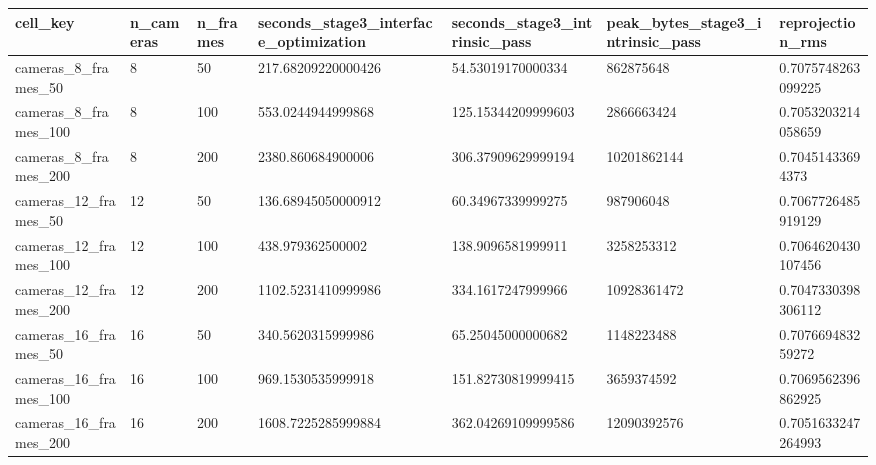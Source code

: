 \begin{tabular}{|l|l|l|l|l|l|l|}
\hline
cell\_key & n\_cameras & n\_frames & seconds\_stage3\_interface\_optimization & seconds\_stage3\_intrinsic\_pass & peak\_bytes\_stage3\_intrinsic\_pass & reprojection\_rms \\
\hline
cameras\_8\_frames\_50 & 8 & 50 & 217.68209220000426 & 54.53019170000334 & 862875648 & 0.7075748263099225 \\
cameras\_8\_frames\_100 & 8 & 100 & 553.0244944999868 & 125.15344209999603 & 2866663424 & 0.7053203214058659 \\
cameras\_8\_frames\_200 & 8 & 200 & 2380.860684900006 & 306.37909629999194 & 10201862144 & 0.70451433694373 \\
cameras\_12\_frames\_50 & 12 & 50 & 136.68945050000912 & 60.34967339999275 & 987906048 & 0.7067726485919129 \\
cameras\_12\_frames\_100 & 12 & 100 & 438.979362500002 & 138.9096581999911 & 3258253312 & 0.7064620430107456 \\
cameras\_12\_frames\_200 & 12 & 200 & 1102.5231410999986 & 334.1617247999966 & 10928361472 & 0.7047330398306112 \\
cameras\_16\_frames\_50 & 16 & 50 & 340.5620315999986 & 65.25045000000682 & 1148223488 & 0.707669483259272 \\
cameras\_16\_frames\_100 & 16 & 100 & 969.1530535999918 & 151.82730819999415 & 3659374592 & 0.7069562396862925 \\
cameras\_16\_frames\_200 & 16 & 200 & 1608.7225285999884 & 362.04269109999586 & 12090392576 & 0.7051633247264993 \\
\hline
\end{tabular}

